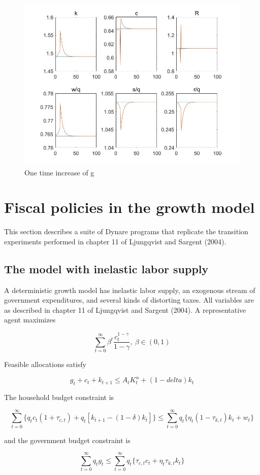 \documentclass[a4paper,12pt]{scrartcl} %
\begin{document}
\begin{figure}[htbp!]
		\centering
			\includegraphics[width=0.8\linewidth]{fig11.jpg}
            \caption{One time increase of g}\label{11}
\end{figure}

\section{Fiscal policies in the growth model}

This section describes a suite of Dynare programs that replicate the transition experiments performed in chapter 11 of Ljungqvist and Sargent (2004).

\subsection{The model with inelastic labor supply}
A deterministic growth model has inelastic labor supply, an exogenous stream of government expenditures, and several kinds of distorting taxes. All variables are as described in chapter 11 of Ljungqvist and Sargent (2004). A representative agent maximizes

$$\sum_{t=0}^{\infty}\beta^t\frac{c_t^{1-\gamma}}{1-\gamma},~\beta \in (0,1)$$

Feasible allocations satisfy

$$g_t+c_t+k_{t+1}\le A_tK_t^{\alpha}+(1-delta)k_t$$

The household budget constraint is

$$\sum_{t=0}^{\infty}\{q_tc_t(1+\tau_{c,t})+q_t[k_{t+1}-(1-\delta)k_t]\}\le \sum_{t=0}^{\infty}q_t\{\eta_t(1-\tau_{k,t})k_t+w_t\}$$

and the government budget constraint is

$$\sum_{t=0}^{\infty}q_tg_t\le \sum_{t=0}^{\infty}q_t\{\tau_{c,t}c_t+\eta_t\tau_{k,t}k_t\}$$
\end{document}
